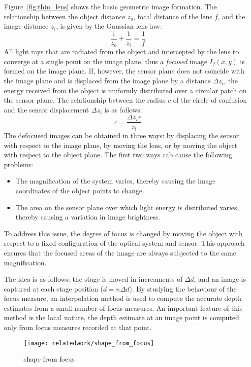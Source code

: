 Figure~\ref{fig:thin_lens} shows the basic geometric image formation. The relationship between the object distance $z_o$, focal distance of the lens $f$, and the image distance $z_i$, is given by the Gaussian lens law:
$$
\frac{1}{z_o}+\frac{1}{z_i}=\frac{1}{f}
$$
All light rays that are radiated from the object and intercepted by the lens to converge at a single point on the image plane, thus a \textit{focused} image $I_f(x, y)$ is formed on the image plane. If, however, the sensor plane does not coincide with the image plane and is displaced from the image plane by a distance $\Delta z_i$, the energy received from the object is uniformly distributed over a circular patch on the sensor plane. The relationship between the radius $c$ of the circle of confusion and the sensor displacement $\Delta z_i$ is as follows:
$$
c = \frac{\Delta z_i r}{z_i}
$$
The defocused images can be obtained in three ways: by displacing the sensor with respect to the image plane, by moving the lens, or by moving the object with respect to the object plane. The first two ways cab cause the following problems:
\begin{itemize}
\item The magnification of the system varies, thereby causing the image coordinates of the object points to change.
\item The area on the sensor plane over which light energy is distributed varies, thereby causing a variation in image brightness.
\end{itemize}
To address this issue, the degree of focus is changed by moving the object with respect to a fixed configuration of the optical system and sensor. This approach ensures that the focused areas of the image are always subjected to the same magnification.

The idea is as follows: the stage is moved in increaments of $\Delta d$, and an image is captured at each stage position ($d=n\Delta d$). By studying the behaviour of the focus measure, an interpolation method is used to compute the accurate depth estimates from a small number of focus measures. An important feature of this method is the local nature, the depth estimate at an image point is computed only from focus measures recorded at that point.
\begin{figure}[h]
\centering
\texttt{[image: relatedwork/shape\_from\_focus]}
\caption{shape from focus}
\label{fig:shape_from_focus}
\end{figure}
